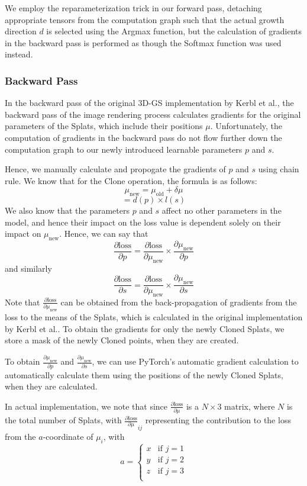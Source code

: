 \documentclass[11pt]{report}
\begin{document}
We employ the reparameterization trick in our forward pass, detaching appropriate tensors from the computation graph such that the actual growth direction $d$ is selected using the Argmax function, but the calculation of gradients in the backward pass is performed as though the Softmax function was used instead.

\subsubsection{Backward Pass}
In the backward pass of the original 3D-GS implementation by Kerbl et al., the backward pass of the image rendering process calculates gradients for the original parameters of the Splats, which include their positions $\mu$. Unfortunately, the computation of gradients in the backward pass do not flow further down the computation graph to our newly introduced learnable parameters $p$ and $s$.

Hence, we manually calculate and propogate the gradients of $p$ and $s$ using chain rule. We know that for the Clone operation, the formula is as follows:
\[ \mu_{\text{new}} = \mu_{\text{old}} + \delta \mu  \]
\[ = d(p) \times l(s) \]
We also know that the parameters $p$ and $s$ affect no other parameters in the model, and hence their impact on the loss value is dependent solely on their impact on \(\mu_{\text{new}}\). Hence, we can say that
\[ \frac{\partial \text{loss}}{\partial p} = \frac{\partial \text{loss}}{\partial \mu_{\text{new}}} \times \frac{\partial \mu_{\text{new}}}{\partial p} \]
and similarly
\[ \frac{\partial \text{loss}}{\partial s} = \frac{\partial \text{loss}}{\partial \mu_{\text{new}}} \times \frac{\partial \mu_{\text{new}}}{\partial s} \]
Note that $\frac{\partial \text{loss}}{\partial \mu_{\text{new}}}$ can be obtained from the back-propagation of gradients from the loss to the means of the Splats, which is calculated in the original implementation by Kerbl et al.. To obtain the gradients for only the newly Cloned Splats, we store a mask of the newly Cloned points, when they are created.

To obtain $\frac{\partial \mu_{\text{new}}}{\partial p}$ and $\frac{\partial \mu_{\text{new}}}{\partial s}$, we can use PyTorch's automatic gradient calculation to automatically calculate them using the positions of the newly Cloned Splats, when they are calculated.

In actual implementation, we note that since $\frac{\partial \text{loss}}{\partial \mu}$ is a $N \times 3$ matrix, where $N$ is the total number of Splats, with $\frac{\partial \text{loss}}{\partial \mu}_{ij}$ representing the contribution to the loss from the $a$-coordinate of $\mu_{i}$, with
\[ a = \begin{cases}
x & \textrm{if }j=1\\
y & \textrm{if }j=2\\
z & \textrm{if }j=3\\
\end{cases} \]
\end{document}

